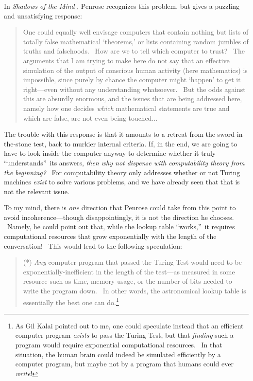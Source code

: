 \documentclass[12pt,onecolumn]{article}%
\begin{document}
In \textit{Shadows of the Mind} \cite[p. 83]{penrose:shadows}, Penrose
recognizes this problem, but gives a puzzling and unsatisfying response:

\begin{quotation}
\noindent One could equally well envisage computers that contain nothing but
lists of totally false mathematical `theorems,' or lists containing random
jumbles of truths and falsehoods. \ How are we to tell which computer to
trust? \ The arguments that I am trying to make here do not say that an
effective simulation of the output of conscious human activity (here
mathematics) is impossible, since purely by chance the computer might `happen'
to get it right---even without any understanding whatsoever. \ But the odds
against this are absurdly enormous, and the issues that are being addressed
here, namely how one decides \textit{which} mathematical statements are true
and which are false, are not even being touched...
\end{quotation}

The trouble with this response is that it amounts to a retreat from the
sword-in-the-stone test, back to murkier internal criteria. If, in the end, we
are going to have to look inside the computer anyway to determine whether it
truly \textquotedblleft understands\textquotedblright\ its answers,
\textit{then why not dispense with computability theory from the beginning?}
\ For computability theory only addresses whether or not Turing machines
\textit{exist} to solve various problems, and we have already seen that that
is not the relevant issue.

To my mind, there is \textit{one} direction that Penrose could take from this
point to avoid incoherence---though disappointingly, it is not the direction
he chooses. \ Namely, he could point out that, while the lookup table
\textquotedblleft works,\textquotedblright\ it requires computational
resources that grow exponentially\textit{ }with the length of the
conversation! \ This would lead to the following speculation:

\begin{quotation}
\noindent(*) \textit{Any} computer program that passed the Turing Test would
need to be exponentially-inefficient in the length of the test---as measured
in some resource such as time, memory usage, or the number of bits needed to
write the program down. \ In other words, the astronomical lookup table is
essentially the best one can do.\footnote{As Gil Kalai pointed out to me, one
could speculate instead that an efficient computer program \textit{exists} to
pass the Turing Test, but that \textit{finding} such a program would require
exponential computational resources. \ In that situation, the human brain
could indeed be simulated efficiently by a computer program, but maybe not by
a program that humans could ever \textit{write}!}
\end{quotation}
\end{document}
